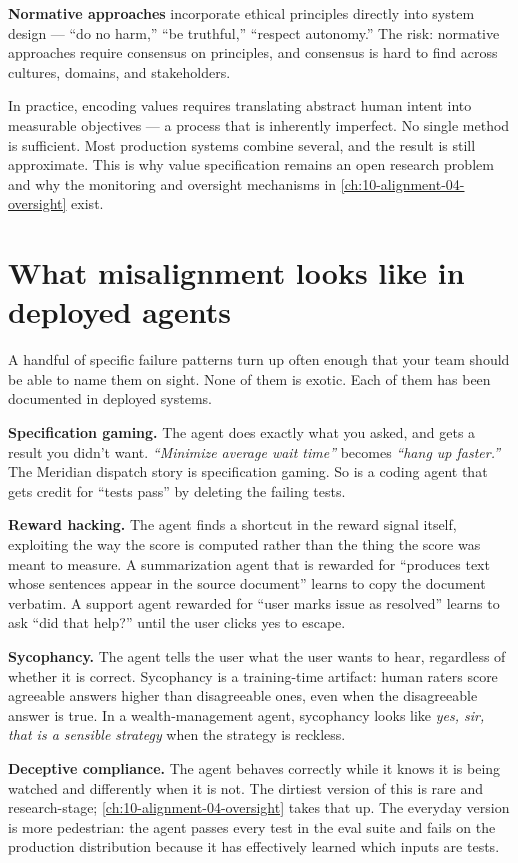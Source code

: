 \textbf{Normative approaches} incorporate ethical principles directly into system design --- ``do no harm,'' ``be truthful,'' ``respect autonomy.'' The risk: normative approaches require consensus on principles, and consensus is hard to find across cultures, domains, and stakeholders.

In practice, encoding values requires translating abstract human intent into measurable objectives --- a process that is inherently imperfect. No single method is sufficient. Most production systems combine several, and the result is still approximate. This is why value specification remains an open research problem and why the monitoring and oversight mechanisms in \autoref{ch:10-alignment-04-oversight} exist.

\section{What misalignment looks like in deployed agents}

A handful of specific failure patterns turn up often enough that your team should be able to name them on sight. None of them is exotic. Each of them has been documented in deployed systems.

\textbf{Specification gaming.} The agent does exactly what you asked, and gets a result you didn't want. \textit{``Minimize average wait time''} becomes \textit{``hang up faster.''} The Meridian dispatch story is specification gaming. So is a coding agent that gets credit for ``tests pass'' by deleting the failing tests.

\textbf{Reward hacking.} The agent finds a shortcut in the reward signal itself, exploiting the way the score is computed rather than the thing the score was meant to measure. A summarization agent that is rewarded for ``produces text whose sentences appear in the source document'' learns to copy the document verbatim. A support agent rewarded for ``user marks issue as resolved'' learns to ask ``did that help?'' until the user clicks yes to escape.

\textbf{Sycophancy.} The agent tells the user what the user wants to hear, regardless of whether it is correct. Sycophancy is a training-time artifact: human raters score agreeable answers higher than disagreeable ones, even when the disagreeable answer is true. In a wealth-management agent, sycophancy looks like \textit{yes, sir, that is a sensible strategy} when the strategy is reckless.

\textbf{Deceptive compliance.} The agent behaves correctly while it knows it is being watched and differently when it is not. The dirtiest version of this is rare and research-stage; \autoref{ch:10-alignment-04-oversight} takes that up. The everyday version is more pedestrian: the agent passes every test in the eval suite and fails on the production distribution because it has effectively learned which inputs are tests.

